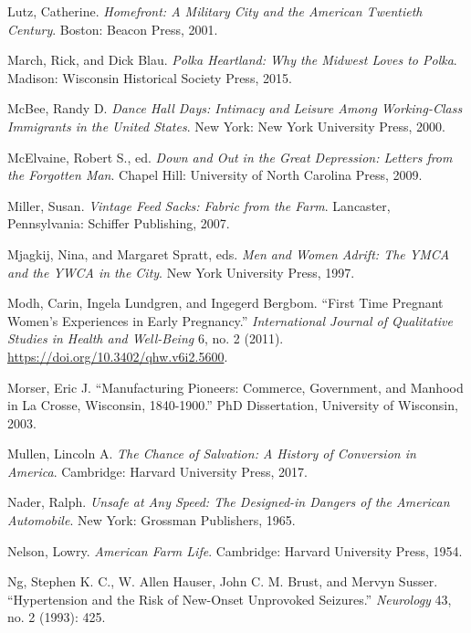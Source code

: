 \documentclass[
  letterpaper,
]{book}
\newlength{\cslhangindent}
\newenvironment{CSLReferences}[2] %
 {\begin{list}{}{%
  \setlength{\itemindent}{0pt}
  \setlength{\leftmargin}{0pt}
  \setlength{\parsep}{0pt}
  \ifodd #1
   \setlength{\leftmargin}{\cslhangindent}
   \setlength{\itemindent}{-1\cslhangindent}
  \fi
  \setlength{\itemsep}{#2\baselineskip}}}
 {\end{list}}
\begin{document}
\begin{CSLReferences}{1}{0}
Lutz, Catherine. \emph{Homefront: A Military City and the American
Twentieth Century}. Boston: Beacon Press, 2001.

March, Rick, and Dick Blau. \emph{Polka Heartland: Why the Midwest Loves
to Polka}. Madison: Wisconsin Historical Society Press, 2015.

McBee, Randy D. \emph{Dance Hall Days: Intimacy and Leisure Among
Working-Class Immigrants in the United States}. New York: New York
University Press, 2000.

McElvaine, Robert S., ed. \emph{Down and Out in the Great Depression:
Letters from the Forgotten Man}. Chapel Hill: University of North
Carolina Press, 2009.

Miller, Susan. \emph{Vintage Feed Sacks: Fabric from the Farm}.
Lancaster, Pennsylvania: Schiffer Publishing, 2007.

Mjagkij, Nina, and Margaret Spratt, eds. \emph{Men and Women Adrift: The
YMCA and the YWCA in the City}. New York University Press, 1997.

Modh, Carin, Ingela Lundgren, and Ingegerd Bergbom. {``First Time
Pregnant Women's Experiences in Early Pregnancy.''} \emph{International
Journal of Qualitative Studies in Health and Well-Being} 6, no. 2
(2011). \url{https://doi.org/10.3402/qhw.v6i2.5600}.

Morser, Eric J. {``Manufacturing Pioneers: Commerce, Government, and
Manhood in La Crosse, Wisconsin, 1840-1900.''} PhD Dissertation,
University of Wisconsin, 2003.

Mullen, Lincoln A. \emph{The Chance of Salvation: A History of
Conversion in America}. Cambridge: Harvard University Press, 2017.

Nader, Ralph. \emph{Unsafe at Any Speed: The Designed-in Dangers of the
American Automobile}. New York: Grossman Publishers, 1965.

Nelson, Lowry. \emph{American Farm Life}. Cambridge: Harvard University
Press, 1954.

Ng, Stephen K. C., W. Allen Hauser, John C. M. Brust, and Mervyn Susser.
{``Hypertension and the Risk of New-Onset Unprovoked Seizures.''}
\emph{Neurology} 43, no. 2 (1993): 425.


\end{CSLReferences}
\end{document}
